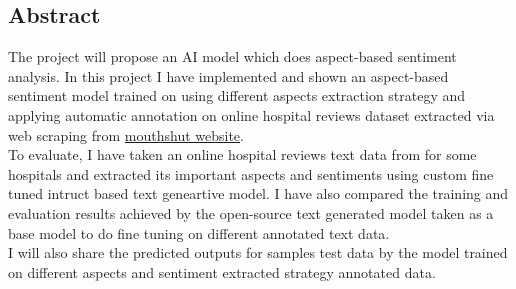 \begin{flushright}
\huge{\section*{Abstract}}
\end{flushright}
The project will propose an AI model which does aspect-based sentiment analysis. In this project I have implemented and shown an aspect-based sentiment model trained on using different aspects extraction strategy and applying automatic annotation on online hospital reviews dataset extracted via web scraping from \href{www.mouthshut.com}{mouthshut website}.
\\
To evaluate, I have taken an online hospital reviews text data from for some hospitals and extracted its important aspects and sentiments using custom fine tuned intruct based text geneartive model. I have also compared the training and evaluation results achieved by the open-source text generated model taken as a base model to do fine tuning on different annotated text data.
\\
I will also share the predicted outputs for samples test data by the model trained on different aspects and sentiment extracted strategy annotated data.

